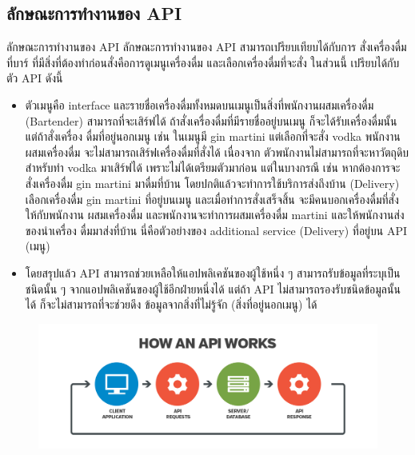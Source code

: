 \subsection{ลักษณะการทํางานของ API}
    ลักษณะการทํางานของ API ลักษณะการทํางานของ API สามารถเปรียบเทียบได้กับการ
สั่งเครื่องดื่มที่บาร์ ที่มีสิ่งที่ต้องทําก่อนสั่งคือการดูเมนูเครื่องดื่ม และเลือกเครื่องดื่มที่จะสั่ง ในส่วนนี้
เปรียบได้กับตัว API ดังนี้
    \begin{itemize}[\textbullet]
        \item ตัวเมนูคือ interface และรายชื่อเครื่องดื่มทั้งหมดบนเมนูเป็นสิ่งที่พนักงานผสมเครื่องดื่ม (Bartender)
            สามารถที่จะเสิร์ฟได้ ถ้าสั่งเครื่องดื่มที่มีรายชื่ออยู่บนเมนู ก็จะได้รับเครื่องดื่มนั้น แต่ถ้าสั่งเครื่อง
            ดื่มที่อยู่นอกเมนู เช่น ในเมนูมี gin martini แต่เลือกที่จะสั่ง vodka พนักงานผสมเครื่องดื่ม
            จะไม่สามารถเสิร์ฟเครื่องดื่มที่สั่งได้ เนื่องจาก ตัวพนักงานไม่สามารถที่จะหาวัตถุดิบสําหรับทํา
            vodka มาเสิร์ฟได้ เพราะไม่ได้เตรียมตัวมาก่อน แต่ในบางกรณี เช่น หากต้องการจะสั่งเครื่องดื่ม
            gin martini มาดื่มที่บ้าน โดยปกติแล้วจะทําการใช้บริการส่งถึงบ้าน (Delivery) เลือกเครื่องดื่ม
            gin martini ที่อยู่บนเมนู และเมื่อทําการสั่งเสร็จสิ้น จะมีคนบอกเครื่องดื่มที่สั่งให้กับพนักงาน
            ผสมเครื่องดื่ม และพนักงานจะทําการผสมเครื่องดื่ม martini และให้พนักงานส่งของนําเครื่อง
            ดื่มมาส่งที่บ้าน นี่คือตัวอย่างของ additional service (Delivery) ที่อยู่บน API (เมนู)
        \item โดยสรุปแล้ว API สามารถช่วยเหลือให้แอปพลิเคชันของผู้ใช้หนึ่ง ๆ สามารถรับข้อมูลที่ระบุเป็น
            ชนิดนั้น ๆ จากแอปพลิเคชันของผู้ใช้อีกฝ่ายหนึ่งได้ แต่ถ้า API ไม่สามารถรองรับชนิดข้อมูลนั้น
            ได้ ก็จะไม่สามารถที่จะช่วยดึง ข้อมูลจากสิ่งที่ไม่รู้จัก (สิ่งที่อยู่นอกเมนู) ได้
    \end{itemize}
    \begin{figure}[H]
            \centering
                \centering
                \includegraphics[width=5in]{latex/figures/API.png}
        \end{figure}



